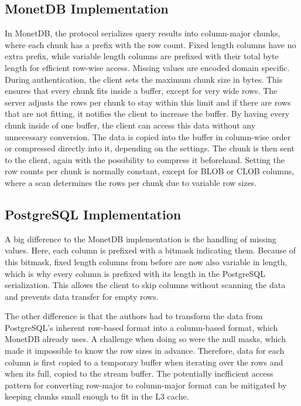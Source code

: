 \documentclass[sigconf]{acmart}
\begin{document}
\subsection{MonetDB Implementation}
In MonetDB, the protocol serializes query results into column-major chunks, where each chunk has a prefix with the row count. Fixed length columns have no extra prefix, while variable length columns are prefixed with their total byte length for efficient row-wise access. Missing values are encoded domain specific.
During authentication, the client sets the maximum chunk size in bytes. This ensures that every chunk fits inside a buffer, except for very wide rows. The server adjusts the rows per chunk to stay within this limit and if there are rows that are not fitting, it notifies the client to increase the buffer. By having every chunk inside of one buffer, the client can access this data without any unnecessary conversion.
The data is copied into the buffer in column-wise order or compressed directly into it, depending on the settings. The chunk is then sent to the client, again with the possibility to compress it beforehand. Setting the row counts per chunk is normally constant, except for BLOB or CLOB columns, where a scan determines the rows per chunk due to variable row sizes.

\subsection{PostgreSQL Implementation}
A big difference to the MonetDB implementation is the handling of missing values. Here, each column is prefixed with a bitmask indicating them. Because of this bitmask, fixed length columns from before are now also variable in length, which is why every column is prefixed with its length in the PostgreSQL serialization. This allows the client to skip columns without scanning the data and prevents data transfer for empty rows.

The other difference is that the authors had to transform the data from PostgreSQL’s inherent row-based format into a column-based format, which MonetDB already uses. A challenge when doing so were the null masks, which made it impossible to know the row sizes in advance. Therefore, data for each column is first copied to a temporary buffer when iterating over the rows and when its full, copied to the stream buffer. The potentially inefficient access pattern for converting row-major to column-major format can be mitigated by keeping chunks small enough to fit in the L3 cache.
\end{document}

